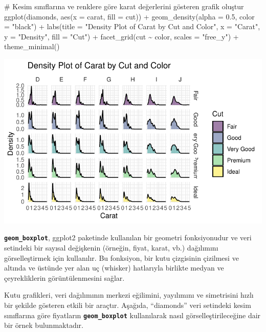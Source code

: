 \documentclass[
  letterpaper,
  DIV=11,
  numbers=noendperiod]{scrreprt}
\newenvironment{Shaded}{\begin{snugshade}}{\end{snugshade}}
\newcommand{\AttributeTok}[1]{\textcolor[rgb]{0.40,0.45,0.13}{#1}}
\newcommand{\CommentTok}[1]{\textcolor[rgb]{0.37,0.37,0.37}{#1}}
\newcommand{\FloatTok}[1]{\textcolor[rgb]{0.68,0.00,0.00}{#1}}
\newcommand{\FunctionTok}[1]{\textcolor[rgb]{0.28,0.35,0.67}{#1}}
\newcommand{\NormalTok}[1]{\textcolor[rgb]{0.00,0.23,0.31}{#1}}
\newcommand{\SpecialCharTok}[1]{\textcolor[rgb]{0.37,0.37,0.37}{#1}}
\newcommand{\StringTok}[1]{\textcolor[rgb]{0.13,0.47,0.30}{#1}}
\begin{document}
\begin{Shaded}
\begin{Highlighting}[]
\CommentTok{\# Kesim sınıflarına ve renklere göre karat değerlerini gösteren grafik oluştur}
\FunctionTok{ggplot}\NormalTok{(diamonds, }\FunctionTok{aes}\NormalTok{(}\AttributeTok{x =}\NormalTok{ carat, }\AttributeTok{fill =}\NormalTok{ cut)) }\SpecialCharTok{+}
  \FunctionTok{geom\_density}\NormalTok{(}\AttributeTok{alpha =} \FloatTok{0.5}\NormalTok{, }\AttributeTok{color =} \StringTok{"black"}\NormalTok{) }\SpecialCharTok{+}
  \FunctionTok{labs}\NormalTok{(}\AttributeTok{title =} \StringTok{"Density Plot of Carat by Cut and Color"}\NormalTok{,}
       \AttributeTok{x =} \StringTok{"Carat"}\NormalTok{,}
       \AttributeTok{y =} \StringTok{"Density"}\NormalTok{,}
       \AttributeTok{fill =} \StringTok{"Cut"}\NormalTok{) }\SpecialCharTok{+}
  \FunctionTok{facet\_grid}\NormalTok{(cut }\SpecialCharTok{\textasciitilde{}}\NormalTok{ color, }\AttributeTok{scales =} \StringTok{"free\_y"}\NormalTok{) }\SpecialCharTok{+}
  \FunctionTok{theme\_minimal}\NormalTok{()}
\end{Highlighting}
\end{Shaded}

\includegraphics{ggplot2_files/figure-pdf/unnamed-chunk-6-1.pdf}

\textbf{\texttt{geom\_boxplot}}, ggplot2 paketinde kullanılan bir
geometri fonksiyonudur ve veri setindeki bir sayısal değişkenin
(örneğin, fiyat, karat, vb.) dağılımını görselleştirmek için kullanılır.
Bu fonksiyon, bir kutu çizgisinin çizilmesi ve altında ve üstünde yer
alan uç (whisker) hatlarıyla birlikte medyan ve çeyrekliklerin
görüntülenmesini sağlar.

Kutu grafikleri, veri dağılımının merkezi eğilimini, yayılımını ve
simetrisini hızlı bir şekilde gösteren etkili bir araçtır. Aşağıda,
``diamonds'' veri setindeki kesim sınıflarına göre fiyatların
\textbf{\texttt{geom\_boxplot}} kullanılarak nasıl görselleştirileceğine
dair bir örnek bulunmaktadır.
\end{document}
